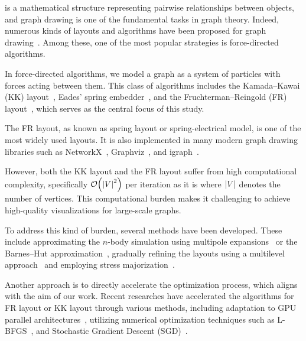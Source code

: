 \documentclass[dvipdfmx,lettersize,journal]{IEEEtran}
\begin{document}
 is a mathematical structure representing pairwise relationships between objects, and graph drawing is one of the fundamental tasks in graph theory.
Indeed, numerous kinds of layouts and algorithms have been proposed for graph drawing~\cite{tutteHowDrawGraph1963,chrobakLineartimeAlgorithmDrawing1995,sugiyamaMethodsVisualUnderstanding1981,ghassemitoosiSimulatedAnnealingPreProcessing2016}.
Among these, one of the most popular strategies is force-directed algorithms.

In force-directed algorithms, we model a graph as a system of particles with forces acting between them.
This class of algorithms includes the Kamada--Kawai (KK) layout~\cite{kamadaAlgorithmDrawingGeneral1989},
Eades' spring embedder~\cite{eades1984heuristic}, and the Fruchterman--Reingold (FR) layout~\cite{fruchtermanGraphDrawingForcedirected1991,kobourovSpringEmbeddersForce2012}, which serves as the central focus of this study.

The FR layout, as known as spring layout or spring-electrical model, is one of the most widely used layouts.
It is also implemented in many modern graph drawing libraries such as NetworkX~\cite{osti_960616}, Graphviz~\cite{ellsonGraphvizOpenSource2002}, and igraph~\cite{csardiIgraphSoftwarePackage2006}.

However, both the KK layout and the FR layout suffer from high computational complexity, specifically $\order{\abs{V}^2}$ per iteration as it is where $\abs{V}$ denotes the number of vertices.
This computational burden makes it challenging to achieve high-quality visualizations for large-scale graphs.

To address this kind of burden, several methods have been developed. These include approximating the $n$-body simulation using multipole expansions~\cite{greengardFastAlgorithmParticle1987} or the Barnes--Hut approximation~\cite{barnesHierarchicalLogForcecalculation1986}, gradually refining the layouts using a multilevel approach~\cite{Hu2006EfficientHF} and employing stress majorization~\cite{gansnerGraphDrawingStress2005}.

Another approach is to directly accelerate the optimization process, which aligns with the aim of our work.
Recent researches have accelerated the algorithms for FR layout or KK layout through various methods, including adaptation to GPU parallel architectures~\cite{gajdosParallelFruchtermanReingold2016}, utilizing numerical optimization techniques such as L-BFGS~\cite{6183577}, and Stochastic Gradient Descent (SGD)~\cite{8419285}.
\end{document}
